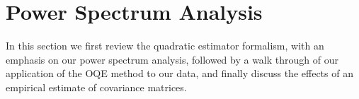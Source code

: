 \documentclass[twocolumn,numberedappendix]{emulateapj} \shorttitle{PSA64}
\begin{document}
\section{Power Spectrum Analysis}\label{sec:oqe}

In this section we first
review the quadratic estimator formalism, with an emphasis on our power
spectrum analysis, followed by a walk through of our application of the OQE
method to our data, and finally discuss the effects of an empirical estimate of
covariance matrices.
\end{document}
